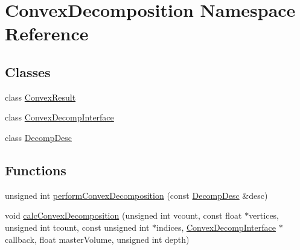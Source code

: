 \hypertarget{namespace_convex_decomposition}{\section{Convex\-Decomposition Namespace Reference}
\label{namespace_convex_decomposition}
}
\subsection*{Classes}
\begin{DoxyCompactItemize}
\item 
class \hyperlink{class_convex_decomposition_1_1_convex_result}{Convex\-Result}
\item 
class \hyperlink{class_convex_decomposition_1_1_convex_decomp_interface}{Convex\-Decomp\-Interface}
\item 
class \hyperlink{class_convex_decomposition_1_1_decomp_desc}{Decomp\-Desc}
\end{DoxyCompactItemize}
\subsection*{Functions}
\begin{DoxyCompactItemize}
\item 
unsigned int \hyperlink{namespace_convex_decomposition_a33efdd41ddb49c0e93d0844d9593df4b}{perform\-Convex\-Decomposition} (const \hyperlink{class_convex_decomposition_1_1_decomp_desc}{Decomp\-Desc} \&desc)
\item 
void \hyperlink{namespace_convex_decomposition_acbcecc410480fa25a690bf2dcbf977c0}{calc\-Convex\-Decomposition} (unsigned int vcount, const float $\ast$vertices, unsigned int tcount, const unsigned int $\ast$indices, \hyperlink{class_convex_decomposition_1_1_convex_decomp_interface}{Convex\-Decomp\-Interface} $\ast$callback, float master\-Volume, unsigned int depth)
\end{DoxyCompactItemize}


